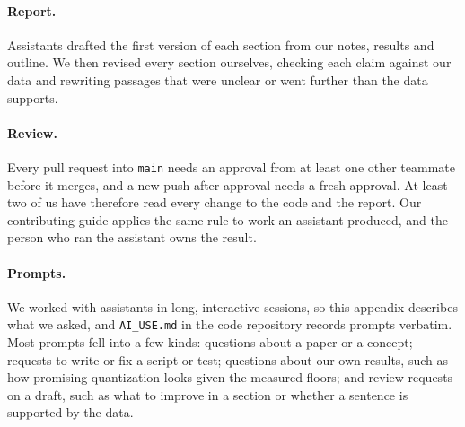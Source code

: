 \documentclass[12pt,letterpaper]{article}
\begin{document}
\paragraph{Report.} Assistants drafted the first version of each section from our notes, results and outline. We then revised every section ourselves, checking each claim against our data and rewriting passages that were unclear or went further than the data supports.

\paragraph{Review.} Every pull request into \texttt{main} needs an approval from at least one other teammate before it merges, and a new push after approval needs a fresh approval. At least two of us have therefore read every change to the code and the report. Our contributing guide applies the same rule to work an assistant produced, and the person who ran the assistant owns the result.

\paragraph{Prompts.} We worked with assistants in long, interactive sessions, so this appendix describes what we asked, and \texttt{AI\_USE.md} in the code repository records prompts verbatim. Most prompts fell into a few kinds: questions about a paper or a concept; requests to write or fix a script or test; questions about our own results, such as how promising quantization looks given the measured floors; and review requests on a draft, such as what to improve in a section or whether a sentence is supported by the data.
\end{document}
